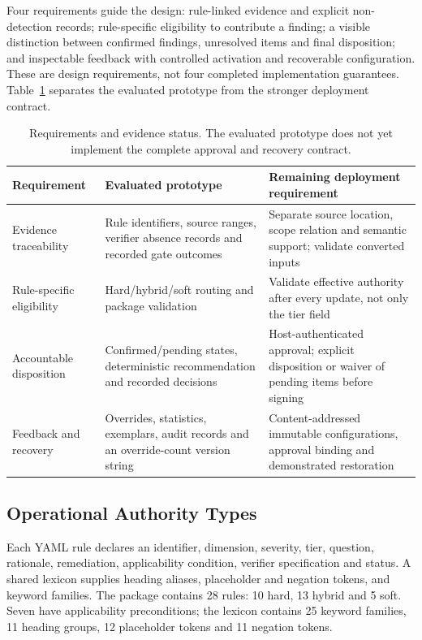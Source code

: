 \documentclass[computers,article,submit,moreauthors]{Definitions/mdpi}
\begin{document}
Four requirements guide the design: rule-linked evidence and explicit non-detection records; rule-specific eligibility to contribute a finding; a visible distinction between confirmed findings, unresolved items and final disposition; and inspectable feedback with controlled activation and recoverable configuration. These are design requirements, not four completed implementation guarantees. Table~\ref{tab:reqs} separates the evaluated prototype from the stronger deployment contract.

\begin{table}[!ht]
\caption{Requirements and evidence status. The evaluated prototype does not yet implement the complete approval and recovery contract.}
\label{tab:reqs}
\centering\footnotesize
\begin{tabularx}{\textwidth}{@{}p{2.4cm}XX@{}}
\toprule
Requirement & Evaluated prototype & Remaining deployment requirement \\
\midrule
Evidence traceability & Rule identifiers, source ranges, verifier absence records and recorded gate outcomes & Separate source location, scope relation and semantic support; validate converted inputs \\
Rule-specific eligibility & Hard/hybrid/soft routing and package validation & Validate effective authority after every update, not only the tier field \\
Accountable disposition & Confirmed/pending states, deterministic recommendation and recorded decisions & Host-authenticated approval; explicit disposition or waiver of pending items before signing \\
Feedback and recovery & Overrides, statistics, exemplars, audit records and an override-count version string & Content-addressed immutable configurations, approval binding and demonstrated restoration \\
\bottomrule
\end{tabularx}
\end{table}

\subsection{Operational Authority Types}\label{sec:rules}

Each YAML rule declares an identifier, dimension, severity, tier, question, rationale, remediation, applicability condition, verifier specification and status. A shared lexicon supplies heading aliases, placeholder and negation tokens, and keyword families. The package contains 28 rules: 10 hard, 13 hybrid and 5 soft. Seven have applicability preconditions; the lexicon contains 25 keyword families, 11 heading groups, 12 placeholder tokens and 11 negation tokens.
\end{document}
